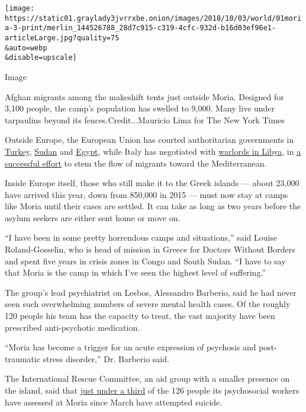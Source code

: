 \texttt{[image: https://static01.graylady3jvrrxbe.onion/images/2018/10/03/world/01moria-3-print/merlin\_144526788\_28d7c915-c319-4cfc-932d-b16d03ef96e1-articleLarge.jpg?quality=75\\\&auto=webp\\\&disable=upscale]}

Image

Afghan migrants among the makeshift tents just outside Moria. Designed
for 3,100 people, the camp's population has swelled to 9,000. Many live
under tarpaulins beyond its fences.Credit...Mauricio Lima for The New
York Times

Outside Europe, the European Union has courted authoritarian governments
in
\href{https://www.nytimes3xbfgragh.onion/2016/03/19/world/europe/european-union-turkey-refugees-migrants.html}{Turkey},
\href{https://www.nytimes3xbfgragh.onion/2018/04/22/world/africa/migration-european-union-sudan.html}{Sudan}
and
\href{https://www.nytimes3xbfgragh.onion/aponline/2018/09/20/world/europe/ap-eu-europe-migrants.html}{Egypt},
while Italy has negotiated with
\href{https://www.nytimes3xbfgragh.onion/2017/09/17/world/europe/italy-libya-migrant-crisis.html}{warlords
in Libya}, in
\href{https://www.nytimes3xbfgragh.onion/interactive/2018/06/27/world/europe/europe-migrant-crisis-change.html}{a
successful effort} to stem the flow of migrants toward the
Mediterranean.

Inside Europe itself, those who still make it to the Greek islands ---
about 23,000 have arrived this year, down from 850,000 in 2015 --- must
now stay at camps like Moria until their cases are settled. It can take
as long as two years before the asylum seekers are either sent home or
move on.

``I have been in some pretty horrendous camps and situations,'' said
Louise Roland-Gosselin, who is head of mission in Greece for Doctors
Without Borders and spent five years in crisis zones in Congo and South
Sudan. ``I have to say that Moria is the camp in which I've seen the
highest level of suffering.''

The group's lead psychiatrist on Lesbos, Alessandro Barberio, said he
had never seen such overwhelming numbers of severe mental health cases.
Of the roughly 120 people his team has the capacity to treat, the vast
majority have been prescribed anti-psychotic medication.

``Moria has become a trigger for an acute expression of psychosis and
post-traumatic stress disorder,'' Dr. Barberio said.

The International Rescue Committee, an aid group with a smaller presence
on the island, said that
\href{https://www.rescue.org/sites/default/files/document/3153/unprotectedunsupporteduncertain.pdf}{just
under a third} of the 126 people its psychosocial workers have assessed
at Moria since March have attempted suicide.


